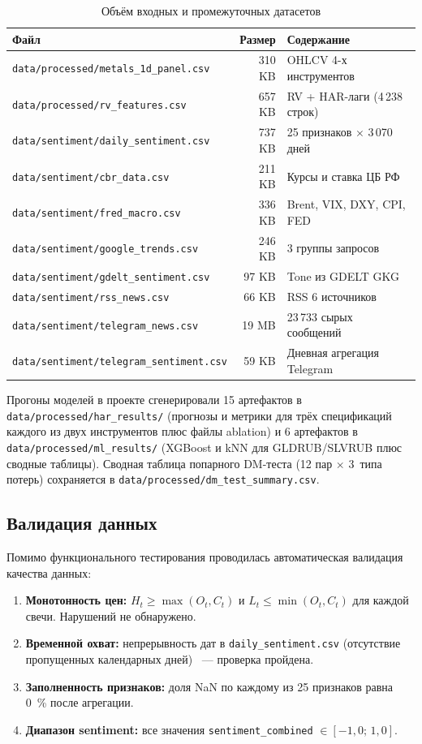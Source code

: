 \begin{table}[h!]
\centering
\caption{Объём входных и промежуточных датасетов}
\label{tab:vol_data}
\small
\begin{tabular}{lrl}
\hline
Файл & Размер & Содержание \\
\hline
\texttt{data/processed/metals\_1d\_panel.csv}   & 310 KB & OHLCV 4-х инструментов \\
\texttt{data/processed/rv\_features.csv}         & 657 KB & RV + HAR-лаги (4\,238 строк) \\
\texttt{data/sentiment/daily\_sentiment.csv}     & 737 KB & 25 признаков $\times$ 3\,070 дней \\
\texttt{data/sentiment/cbr\_data.csv}            & 211 KB & Курсы и ставка ЦБ РФ \\
\texttt{data/sentiment/fred\_macro.csv}          & 336 KB & Brent, VIX, DXY, CPI, FED \\
\texttt{data/sentiment/google\_trends.csv}       & 246 KB & 3 группы запросов \\
\texttt{data/sentiment/gdelt\_sentiment.csv}     &  97 KB & Tone из GDELT GKG \\
\texttt{data/sentiment/rss\_news.csv}            &  66 KB & RSS 6 источников \\
\texttt{data/sentiment/telegram\_news.csv}       &  19 MB & 23\,733 сырых сообщений \\
\texttt{data/sentiment/telegram\_sentiment.csv}  &  59 KB & Дневная агрегация Telegram \\
\hline
\end{tabular}
\end{table}

Прогоны моделей в проекте сгенерировали 15 артефактов в
\texttt{data/processed/har\_results/} (прогнозы и метрики для трёх
спецификаций каждого из двух инструментов плюс файлы ablation)
и 6 артефактов в \texttt{data/processed/ml\_results/}
(XGBoost и kNN для GLDRUB/SLVRUB плюс сводные таблицы).
Сводная таблица попарного DM-теста (12 пар $\times$ 3~типа потерь)
сохраняется в \texttt{data/processed/dm\_test\_summary.csv}.

\subsection{Валидация данных}

Помимо функционального тестирования проводилась автоматическая
валидация качества данных:

\begin{enumerate}
    \item \textbf{Монотонность цен:}
          $H_t \geq \max(O_t, C_t)$ и $L_t \leq \min(O_t, C_t)$
          для каждой свечи. Нарушений не обнаружено.
    \item \textbf{Временной охват:}
          непрерывность дат в \texttt{daily\_sentiment.csv}
          (отсутствие пропущенных календарных дней) ~--- проверка пройдена.
    \item \textbf{Заполненность признаков:}
          доля NaN по каждому из 25 признаков равна 0~\% после агрегации.
    \item \textbf{Диапазон sentiment:}
          все значения \texttt{sentiment\_combined} $\in [-1{,}0;\, 1{,}0]$.
\end{enumerate}
